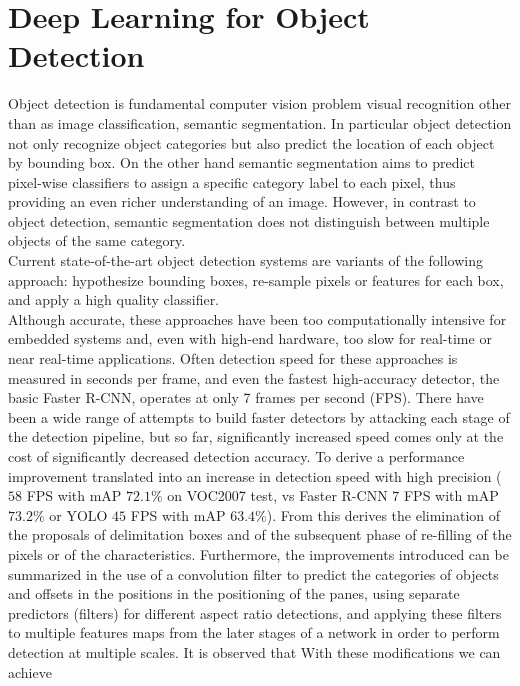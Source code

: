 \section{Deep Learning for Object Detection}
\label{sec:nn-objectdetection}
Object detection is fundamental computer vision problem visual recognition other
than as image classification, semantic segmentation. In particular object
detection not only recognize object categories but also predict the location of
each object by  bounding box. On the other hand semantic segmentation aims to
predict pixel-wise classifiers to assign a specific category label to each
pixel, thus providing an even richer understanding of an image. However, in
contrast to object detection, semantic segmentation does not distinguish between
multiple objects of the same category.\cite{wu2020recent}\\
Current state-of-the-art object detection systems are variants of the following
approach: hypothesize bounding boxes, re-sample pixels or features for each box,
and apply a high quality classifier.\\  
Although accurate, these approaches have
been too computationally intensive for embedded systems and, even with high-end
hardware, too slow for real-time or near real-time applications. Often detection
speed for these approaches is measured in seconds per frame, and even the
fastest high-accuracy detector, the basic Faster R-CNN, operates at only 7
frames per second (FPS). There have been a wide range of attempts to build
faster detectors by attacking each stage of the detection pipeline, but so far,
significantly increased speed comes only at the cost of significantly decreased
detection accuracy.\cite{liu2016ssd}
To derive a performance improvement translated into an increase in detection
speed with high precision ($58$ FPS with mAP $72.1\%$ on VOC2007 test, vs Faster
R-CNN $7$ FPS with mAP $73.2\%$ or YOLO $45$ FPS with mAP $63.4\%$). From this
derives the elimination of the proposals of delimitation boxes and of the
subsequent phase of re-filling of the pixels or of the characteristics.
Furthermore, the improvements introduced can be summarized in the use of a
convolution filter to predict the categories of objects and offsets in the
positions in the positioning of the panes, using separate predictors (filters)
for different aspect ratio detections, and applying these filters to multiple
features maps from the later stages of a network in order to perform detection
at multiple scales. \hfill \break
It is observed that With these modifications we can achieve

